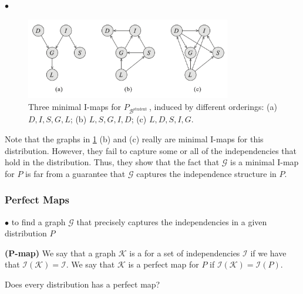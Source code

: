 \documentclass{article}
\newcommand{\bfs}[1]{\textbf{({#1}) }}
\begin{document}
$\bullet$  

\begin{figure}[H]
    \centering
    \includegraphics[width=0.8\textwidth]{Figs/a10.png}
    \caption{Three minimal I-maps for $P_{\mathcal{B}^{\text {student }}}$, induced by different orderings: (a) $D, I, S, G, L$; (b) $L, S, G, I, D$; (c) $L, D, S, I, G$.}
    \label{fig:ujughfa}
\end{figure}

\begin{exma}
Note that the graphs in \cref{fig:ujughfa} (b) and (c) really are minimal I-maps for this distribution. However, they fail to capture some or all of the independencies that hold in the distribution. Thus, they show that the fact that $\mathcal{G}$ is a minimal I-map for $P$ is far from a guarantee that $\mathcal{G}$ captures the independence structure in $P$.
\end{exma}

\subsubsection{Perfect Maps}
$\bullet$  to find a graph $\mathcal{G}$ that precisely captures the independencies in a given distribution $P$
\begin{defa}\bfs{P-map}
We say that a graph $\mathcal{K}$ is a  for a set of independencies $\mathcal{I}$ if we have that $\mathcal{I}(\mathcal{K})=\mathcal{I}$. We say that $\mathcal{K}$ is a perfect map for $P$ if $\mathcal{I}(\mathcal{K})=\mathcal{I}(P)$.
\end{defa}
 Does every distribution has a perfect map? 
\end{document}
